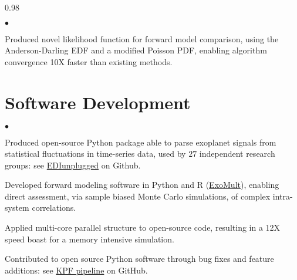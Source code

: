\documentclass[margin,line, 12pt]{res}
\newenvironment{list2}{
  \begin{list}{$\bullet$}{%
      \setlength{\itemsep}{0.04in}
      \setlength{\parsep}{0.00in} \setlength{\parskip}{0in}
      \setlength{\topsep}{0.0in} \setlength{\partopsep}{0in}
      \setlength{\leftmargin}{0.2in}}}{\end{list}}
\begin{document}
\begin{spacing}{0.98}
\begin{resume}
\begin{list2}
	\item Produced novel likelihood function for forward model comparison, using the Anderson-Darling EDF and a modified Poisson PDF, enabling algorithm convergence 10X faster than existing methods.    
	

    \end{list2}
\vspace*{-2mm}

\section{Software Development}
	\begin{list2}
	\item Produced open-source Python package able to parse exoplanet signals from statistical fluctuations in time-series data, used by $27$ independent research groups: see \href{https://github.com/jonzink/EDI_Vetter_unplugged}{EDIunplugged} on Github.
	
	\item Developed forward modeling software in Python and R (\href{https://github.com/jonzink/ExoMult}{ExoMult}), enabling direct assessment, via sample biased Monte Carlo simulations, of complex intra-system correlations.
	
	
	\item Applied multi-core parallel structure to open-source code, resulting in a 12X speed boast for a memory intensive simulation.
		
	\item Contributed to open source Python software through bug fixes and feature additions: see \href{https://github.com/California-Planet-Search/KPF-CPS}{KPF pipeline} on GitHub.
	\end{list2}
	


\end{resume}
\end{spacing}
\end{document}
